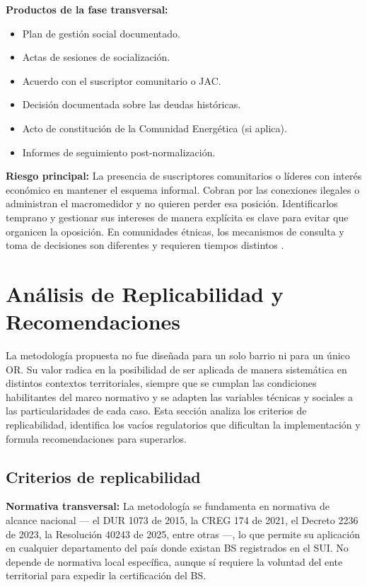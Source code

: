 \textbf{Productos de la fase transversal:}
\begin{itemize}
    \item Plan de gestión social documentado.
    \item Actas de sesiones de socialización.
    \item Acuerdo con el suscriptor comunitario o JAC.
    \item Decisión documentada sobre las deudas históricas.
    \item Acto de constitución de la Comunidad Energética (si aplica).
    \item Informes de seguimiento post-normalización.
\end{itemize}

\textbf{Riesgo principal:} La presencia de suscriptores comunitarios o
líderes con interés económico en mantener el esquema informal. Cobran
por las conexiones ilegales o administran el macromedidor y no quieren
perder esa posición. Identificarlos temprano y gestionar sus intereses
de manera explícita es clave para evitar que organicen la oposición. En
comunidades étnicas, los mecanismos de consulta y toma de decisiones
son diferentes y requieren tiempos distintos \parencite{DANE2018}.


\section{Análisis de Replicabilidad y Recomendaciones}
\label{sec:replicabilidad}

La metodología propuesta no fue diseñada para un solo barrio ni para
un único OR. Su valor radica en la posibilidad de ser aplicada de manera
sistemática en distintos contextos territoriales, siempre que se cumplan
las condiciones habilitantes del marco normativo y se adapten las
variables técnicas y sociales a las particularidades de cada caso. Esta
sección analiza los criterios de replicabilidad, identifica los vacíos
regulatorios que dificultan la implementación y formula recomendaciones
para superarlos.

\subsection{Criterios de replicabilidad}
\label{subsec:criterios_replicabilidad}

\textbf{Normativa transversal:} La metodología se fundamenta en
normativa de alcance nacional — el DUR 1073 de 2015, la CREG 174 de
2021, el Decreto 2236 de 2023, la Resolución 40243 de 2025, entre
otras —, lo que permite su aplicación en cualquier departamento del país
donde existan BS registrados en el SUI. No depende de normativa local
específica, aunque sí requiere la voluntad del ente territorial para
expedir la certificación del BS.

